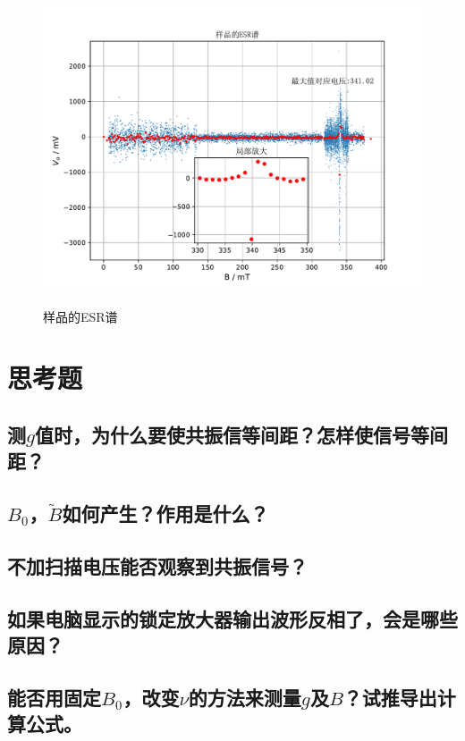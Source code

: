 \documentclass[a4paper]{article}
\begin{document}
\begin{figure}[!h]
\centering
\includegraphics[width=12cm]{fig/data.pdf}\\
\caption{样品的ESR谱}\label{dataESR}    
\end{figure}

\section{思考题}
\subsection{测$ g $值时，为什么要使共振信等间距？怎样使信号等间距？}
\subsection{$B_0$，$\tilde{B}$如何产生？作用是什么？}
\subsection{不加扫描电压能否观察到共振信号？}
\subsection{如果电脑显示的锁定放大器输出波形反相了，会是哪些原因？}
\subsection{能否用固定$B_0$，改变$\nu$的方法来测量$ g $及$ B $？试推导出计算公式。}

\nocite{jiaocai}

\end{document}
